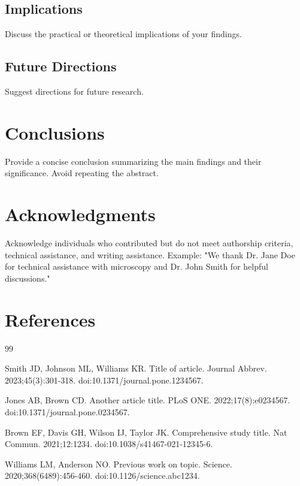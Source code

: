 \documentclass[10pt,letterpaper]{article}
\begin{document}
\subsection*{Implications}
Discuss the practical or theoretical implications of your findings.

\subsection*{Future Directions}
Suggest directions for future research.

\section*{Conclusions}

Provide a concise conclusion summarizing the main findings and their significance. Avoid repeating the abstract.

\section*{Acknowledgments}

Acknowledge individuals who contributed but do not meet authorship criteria, technical assistance, and writing assistance. Example: "We thank Dr. Jane Doe for technical assistance with microscopy and Dr. John Smith for helpful discussions."

\section*{References}




\begin{thebibliography}{99}

Smith JD, Johnson ML, Williams KR. Title of article. Journal Abbrev. 2023;45(3):301-318. doi:10.1371/journal.pone.1234567.

Jones AB, Brown CD. Another article title. PLoS ONE. 2022;17(8):e0234567. doi:10.1371/journal.pone.0234567.

Brown EF, Davis GH, Wilson IJ, Taylor JK. Comprehensive study title. Nat Commun. 2021;12:1234. doi:10.1038/s41467-021-12345-6.

Williams LM, Anderson NO. Previous work on topic. Science. 2020;368(6489):456-460. doi:10.1126/science.abc1234.

\end{thebibliography}
\end{document}
